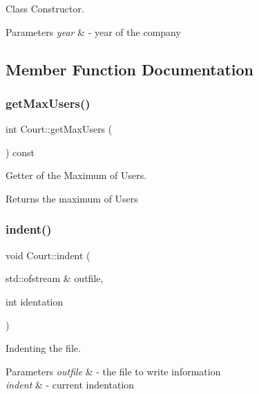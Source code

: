 Class Constructor. 


\begin{DoxyParams}{Parameters}
{\em year} & -\/ year of the company \\
\hline
\end{DoxyParams}


\subsection{Member Function Documentation}
\mbox{\label{class_court_a9992ef2a5d2ee81e8cc7f24f8c917f31}} 
\subsubsection{\texorpdfstring{get\+Max\+Users()}{getMaxUsers()}}
{\footnotesize\ttfamily int Court\+::get\+Max\+Users (\begin{DoxyParamCaption}{ }\end{DoxyParamCaption}) const}



Getter of the Maximum of Users. 

\begin{DoxyReturn}{Returns}
the maximum of Users 
\end{DoxyReturn}
\mbox{\label{class_court_ae08f3e2f1119073fffc251fc1e725550}} 
\subsubsection{\texorpdfstring{indent()}{indent()}}
{\footnotesize\ttfamily void Court\+::indent (\begin{DoxyParamCaption}\item[{std\+::ofstream \&}]{outfile,  }\item[{int}]{identation }\end{DoxyParamCaption})}



Indenting the file. 


\begin{DoxyParams}{Parameters}
{\em outfile} & -\/ the file to write information \\
\hline
{\em indent} & -\/ current indentation \\
\hline
\end{DoxyParams}
\mbox{\label{class_court_a2d801d3edd9d0280ef0420b131e07f2e}} 
